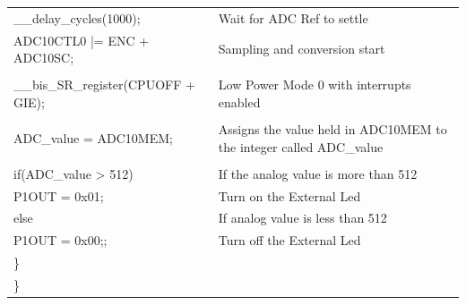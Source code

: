 \documentclass[12pt, letterpaper]{article}
\begin{document}
\begin{longtable}{|p{8cm}||p{6cm}|}
     \hspace{0.3cm}   \_\_delay\_cycles(1000);	& Wait for ADC Ref to settle \\
     \hspace{0.3cm}   ADC10CTL0 |= ENC + ADC10SC;	& Sampling and conversion start\\
   \hspace{0.1cm} & \\
      \hspace{0.3cm}  \_\_bis\_SR\_register(CPUOFF + GIE);& Low Power Mode 0 with interrupts enabled \\
\hspace{0.1cm} & \\
      \hspace{0.3cm}   ADC\_value = ADC10MEM;& Assigns the value held in ADC10MEM to the integer called ADC\_value \\
      \hspace{0.1cm} & \\
      \hspace{0.3cm} if(ADC\_value > 512) & If the analog value is more than 512\\
        \hspace{0.5cm}     P1OUT = 0x01; & Turn on the External Led\\ 
        \hspace{0.3cm} else & If analog value is less than 512\\
        \hspace{0.5cm}    P1OUT = 0x00;; & Turn off the External Led\\
        \hspace{0.1cm} \} & \\

            \} & \\

\end{longtable}
\end{document}
